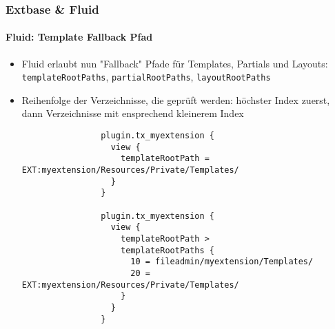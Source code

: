 \begin{frame}[fragile]
	\frametitle{Extbase \& Fluid}
	\framesubtitle{Fluid: Template Fallback Pfad}

	\lstset{
		basicstyle=\tiny\ttfamily
	}

	\begin{itemize}
		\item Fluid erlaubt nun "Fallback" Pfade für Templates, Partials und Layouts:\newline
			\smaller\texttt{templateRootPaths}, \texttt{partialRootPaths}, \texttt{layoutRootPaths}\normalsize
		\item Reihenfolge der Verzeichnisse, die geprüft werden: höchster Index zuerst, dann
			Verzeichnisse mit ensprechend kleinerem Index

			\begin{lstlisting}
				plugin.tx_myextension {
				  view {
				    templateRootPath = EXT:myextension/Resources/Private/Templates/
				  }
				}

				plugin.tx_myextension {
				  view {
				    templateRootPath >
				    templateRootPaths {
				      10 = fileadmin/myextension/Templates/
				      20 = EXT:myextension/Resources/Private/Templates/
				    }
				  }
				}
			\end{lstlisting}

	\end{itemize}

\end{frame}


